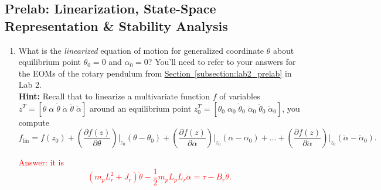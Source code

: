 \documentclass[12pt]{report}
\newcommand\drew[1]{\textcolor{red}{#1}}
\begin{document}
\subsection{Prelab: Linearization, State-Space Representation \& Stability Analysis}\label{subsection:lab3_prelab}
\begin{enumerate}
    \item What is the \emph{linearized} equation of motion for generalized coordinate $\theta$ about equilibrium point $\theta_0 = 0$ and $\alpha_0 = 0$? You'll need to refer to your answers for the EOMs of the rotary pendulum from \hyperref[subsection:lab2_prelab]{Section~\ref{subsection:lab2_prelab}} in Lab 2.\\
          \textbf{Hint:} Recall that to linearize a multivariate function $f$ of variables $z^T = [\theta \; \alpha \; \dot{\theta} \; \dot{\alpha} \; \ddot{\theta} \; \ddot{\alpha}]$ around an equilibrium point $z_{0}^T = [\theta_0 \; \alpha_0 \; \dot{\theta}_0 \; \dot{\alpha}_0 \; \ddot{\theta}_0 \; \ddot{\alpha}_0]$, you compute
          \[
              f_\text{lin} = f(z_0) + \left(\frac{\partial f(z)}{\partial \theta}\right) \bigg|_{z_0}  (\theta - \theta_0) +  \left(\frac{\partial f(z)}{\partial \alpha}\right) \bigg|_{z_0}  (\alpha - \alpha_0) + \dots +  \left(\frac{\partial f(z)}{\partial \ddot{\alpha}}\right) \bigg|_{z_0}  (\ddot{\alpha} - \ddot{\alpha}_0).
          \]

          \drew{Answer: it is
              \[
                  \left(m_p L_{r}^{2} + J_r\right) \ddot{\theta} - \frac{1}{2} m_p L_p L_r \ddot{\alpha} = \tau - B_r \dot{\theta}.
              \]

}
\end{enumerate}
\end{document}
